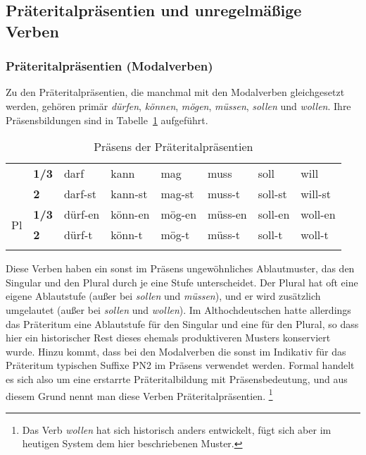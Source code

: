 \subsection{Präteritalpräsentien und unregelmäßige Verben}

\label{sec:hvflex}

\subsubsection{Präteritalpräsentien (Modalverben)}

\label{sec:modv}

Zu den Präteritalpräsentien, die manchmal mit den Modalverben gleichgesetzt werden, gehören primär \textit{dürfen}, \textit{können}, \textit{mögen}, \textit{müssen}, \textit{sollen} und \textit{wollen}.
Ihre Präsensbildungen sind in Tabelle~\ref{tab:modpraes} aufgeführt.


\begin{table}
  \centering
  \begin{tabular}{llllllll}
    \lsptoprule
    \multirow{2}{*}{\textbf{Sg}} & \textbf{1/3} & darf & kann & mag & muss & soll & will \\
    & \textbf{2} & darf-st & kann-st & mag-st & muss-t & soll-st & will-st \\
    \midrule
    \multirow{2}{*}{Pl} & \textbf{1/3} & dürf-en & könn-en & mög-en & müss-en & soll-en & woll-en \\
    & \textbf{2} & dürf-t & könn-t & mög-t & müss-t & soll-t & woll-t \\
    \lspbottomrule
  \end{tabular}
  \caption{Präsens der Präteritalpräsentien}
  \label{tab:modpraes}
\end{table}

Diese Verben haben ein sonst im Präsens ungewöhnliches Ablautmuster, das den Singular und den Plural durch je eine Stufe unterscheidet.
Der Plural hat oft eine eigene Ablautstufe (außer bei \textit{sollen} und \textit{müssen}), und er wird zusätzlich umgelautet (außer bei \textit{sollen} und \textit{wollen}).
Im Althochdeutschen hatte allerdings das Präteritum eine Ablautstufe für den Singular und eine für den Plural, so dass hier ein historischer Rest dieses ehemals produktiveren Musters konserviert wurde.
Hinzu kommt, dass bei den Modalverben die sonst im Indikativ für das Präteritum typischen Suffixe PN2 im Präsens verwendet werden.
Formal handelt es sich also um eine erstarrte Präteritalbildung mit Präsensbedeutung, und aus diesem Grund nennt man diese Verben Präteritalpräsentien.%
\footnote{Das Verb \textit{wollen} hat sich historisch anders entwickelt, fügt sich aber im heutigen System dem hier beschriebenen Muster.}

